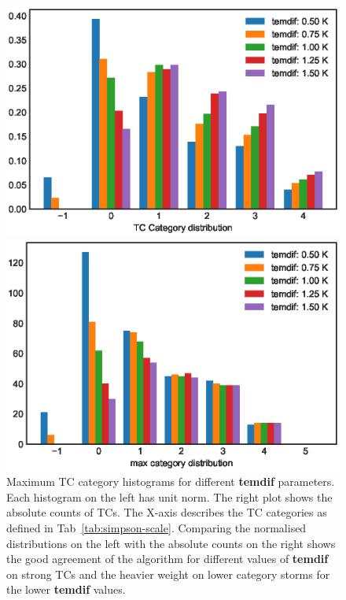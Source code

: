 \begin{figure}[ht]
	\begin{minipage}[t]{0.48\textwidth}
		\includegraphics[width = \textwidth]{img/max_cat_distr_temdifs.eps}
	\end{minipage}
	\hfill
	\begin{minipage}[t]{0.48\textwidth}
		\includegraphics[width = \textwidth]{img/max_cat_counts_temdifs.eps}
	\end{minipage}
	\caption{Maximum TC category histograms for different \textbf{temdif} parameters. Each histogram on the left has unit norm. The right plot shows the absolute counts of TCs. The X-axis describes the TC categories as defined in Tab~\ref{tab:simpson-scale}. Comparing the normalised distributions on the left with the absolute counts on the right shows the good agreement of the algorithm for different values of \textbf{temdif} on strong TCs and the heavier weight on lower category storms for the lower \textbf{temdif} values.}
	\label{fig:temdif-analysis}
\end{figure}


